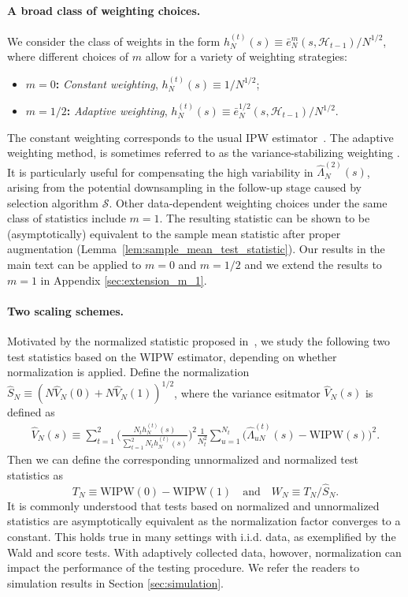 \documentclass[12pt]{article}
\newcommand{\WIPW}{\mathrm{WIPW}}
\begin{document}
\paragraph{A broad class of weighting choices.}
We consider the class of weights in the form \(h_{N}^{(t)}(s) \equiv \bar{e}_N^{m}(s, \mathcal{H}_{t-1}) / N^{1/2}\), where different choices of $m$ allow for a variety of weighting strategies:
\begin{itemize}
    \item \textbf{\(m = 0\):} \textit{Constant weighting}, \(h_{N}^{(t)}(s) \equiv 1 / N^{1/2}\);
    \item \textbf{\(m = 1/2\):} \textit{Adaptive weighting}, \(h_{N}^{(t)}(s) \equiv \bar e_N^{1/2}(s,\mathcal{H}_{t-1}) / N^{1/2}\).
\end{itemize}
The constant weighting corresponds to the usual IPW estimator~\citep{bowden2017unbiased}. The adaptive weighting method, is sometimes referred to as the variance-stabilizing weighting \citep{luedtke2016statistical,Hadad2021,bibaut2024demistifying}. It is particularly useful for compensating the high variability in \(\hat{\Lambda}_{N}^{(2)}(s)\), arising from the potential downsampling in the follow-up stage caused by selection algorithm $\mathcal{S}$. Other data-dependent weighting choices under the same class of statistics include \textbf{\(m = 1\)}. The resulting statistic can be shown to be (asymptotically) equivalent to the sample mean statistic after proper augmentation (Lemma~\ref{lem:sample_mean_test_statistic}). Our results in the main text can be applied to $m=0$ and $m=1/2$ and we extend the results to $m=1$ in Appendix \ref{sec:extension_m_1}. 

\paragraph{Two scaling schemes.}

Motivated by the normalized statistic proposed in~\citet{Hadad2021}, we study the following two test statistics based on the WIPW estimator, depending on whether normalization is applied. Define the normalization $\hat S_N\equiv (N\hat V_N(0)+N\hat V_N(1))^{1/2}$, where 
the variance esitmator $\hat{V}_N(s)$ is defined as
\begin{align}\label{eq:variance-estimator}
	\hat{V}_N(s) \equiv \sum_{t=1}^2 \Big(\frac{N_t h_{N}^{(t)}(s)}{\sum_{t=1}^2 N_t h_{N}^{(t)}(s)}\Big)^2 \frac{1}{N_t^2}\sum_{u=1}^{N_t} \big(\hat{\Lambda}_{uN}^{(t)}(s) - \WIPW(s)\big)^2.
\end{align}
Then we can define the corresponding unnormalized and normalized test statistics as
\[
T_N \equiv \WIPW(0) - \WIPW(1)\quad\text{and}\quad 
W_N \equiv T_N / \hat S_N.
\]
It is commonly understood that tests based on normalized and unnormalized statistics are asymptotically equivalent as the normalization factor converges to a constant.
This holds true in many settings with i.i.d. data, as exemplified by the Wald and score tests. 
With adaptively collected data, howover, normalization can impact the performance of the testing procedure. We refer the readers to simulation results in Section \ref{sec:simulation}.
\end{document}
